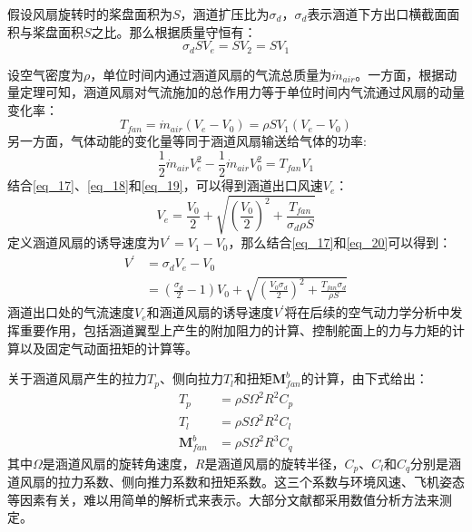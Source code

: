 假设风扇旋转时的桨盘面积为$S$，涵道扩压比为$\sigma_d$，$\sigma_d$表示涵道下方出口横截面面积与桨盘面积$S$之比。那么根据质量守恒有：
\begin{equation}
    \sigma_dSV_e=SV_2=SV_1
    \label{eq_17}
\end{equation}

设空气密度为$\rho$，单位时间内通过涵道风扇的气流总质量为$\dot{m}_{air}$。一方面，根据动量定理可知，涵道风扇对气流施加的总作用力等于单位时间内气流通过风扇的动量变化率：
\begin{equation}
    T_{fan}=\dot{m}_{air}(V_e-V_0)=\rho S V_1(V_e-V_0)
    \label{eq_18}
\end{equation}
另一方面，气体动能的变化量等同于涵道风扇输送给气体的功率:
\begin{equation}
    \frac{1}{2}\dot{m}_{air}V_e^2-\frac{1}{2}\dot{m}_{air}V_0^2=T_{fan}V_1
    \label{eq_19}
\end{equation}
结合\eqref{eq_17}、\eqref{eq_18}和\eqref{eq_19}，可以得到涵道出口风速$V_e$\cite{pereiraHoverWindtunnelTesting2008}：
\begin{equation}
    V_e=\frac{V_0}{2}+\sqrt{\left(\frac{V_0}{2}\right)^2+\frac{T_{fan}}{\sigma_d\rho S}}    \label{eq_20}
\end{equation}
定义涵道风扇的诱导速度为$V^{\prime}=V_1-V_0$，那么结合\eqref{eq_17}和\eqref{eq_20}可以得到：
\begin{equation}
    \begin{aligned}
    V^{\prime}&=\sigma_dV_e-V_0 \\
    &=\left(\frac{\sigma_d}{2}-1\right)V_0+\sqrt{\left(\frac{V_0\sigma_d}{2}\right)^2+\frac{T_{fan}\sigma_d}{\rho S}}
    \label{induced velocity}
    \end{aligned}
\end{equation}
涵道出口处的气流速度$V_e$和涵道风扇的诱导速度$V^{\prime}$将在后续的空气动力学分析中发挥重要作用，包括涵道翼型上产生的附加阻力的计算、控制舵面上的力与力矩的计算以及固定气动面扭矩的计算等。

关于涵道风扇产生的拉力$T_{p}$、侧向拉力$T_{l}$和扭矩$\boldsymbol{M}_{fan}^b$的计算，由下式给出\cite{luoNumericalAnalysisWind2024a}：
\begin{equation}
    \begin{aligned}
        T_{p}&=\rho S \Omega^2R^2 C_{p}\\
        T_{l}&=\rho S \Omega^2R^2 C_{l}\\
        \boldsymbol{M}_{fan}^b&=\rho S \Omega^2 R^3C_{q}
    \end{aligned}
    \label{eq_21}
\end{equation}
其中$\Omega$是涵道风扇的旋转角速度，$R$是涵道风扇的旋转半径，$C_{p}$、$C_{l}$和$C_{q}$分别是涵道风扇的拉力系数、侧向推力系数和扭矩系数。这三个系数与环境风速、飞机姿态等因素有关，难以用简单的解析式来表示。大部分文献都采用数值分析方法来测定\cite{iiiNondimensionalModelingDuctedFan2012,choiStaticAnalysisSmall2012,luoNumericalAnalysisWind2024a}。

